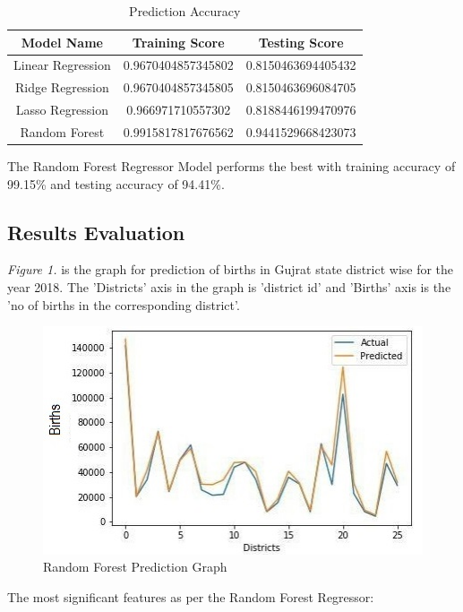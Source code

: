 \documentclass[]{article}
\begin{document}
\begin{table}[h]
    \centering
    \begin{tabular}{||c c c||}

\hline
Model Name&Training Score&Testing Score  \\[1ex]
 \hline \hline
Linear Regression&0.9670404857345802 &0.8150463694405432 \\[1ex]
 \hline
Ridge Regression&0.9670404857345805&0.8150463696084705\\[1ex]
\hline
Lasso Regression&0.966971710557302&0.8188446199470976\\[1ex]
\hline
Random Forest&0.9915817817676562&0.9441529668423073\\[1ex]
\hline

\end{tabular}
    \caption{Prediction Accuracy}
    
\end{table}

The Random Forest Regressor Model performs the best with training accuracy of  99.15\% and testing accuracy of 94.41\%. 


\subsection{Results Evaluation}
\textit{Figure 1.} is the graph for prediction of births in Gujrat state district wise for the year 2018. The 'Districts' axis in the graph is 'district id' and 'Births' axis is the 'no of births in the corresponding district'.

\begin{figure}[h]
\centering
\includegraphics[scale=1]{graph.jpg}
\caption{Random Forest Prediction Graph}
\end{figure}

\bigskip

The most significant features as per the Random Forest Regressor:
\end{document}
